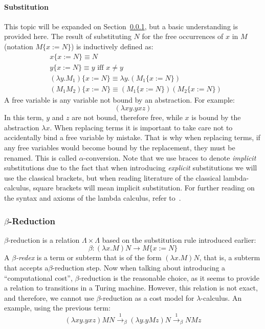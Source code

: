 \documentclass[11pt]{article}
\begin{document}
\paragraph{Substitution} This topic will be expanded on Section~\ref{reduction}, but a basic understanding is provided here.
The result of substituting $N$ for the free occurrences of $x$ in $M$ (notation $M \{ x:= N \} $) is inductively defined as:
\begin{equation*}
  \begin{split}
    & x\{ x := N \} \equiv N \\
    & y \{ x := N \} \equiv y \text{ iff } x \neq y \\
    & (\lambda y.M_{1}) \{ x:=N \} \equiv \lambda y. ( M_{1} \{ x:=N \} ) \\
    & (M_{1}M_{2}) \{ x:=N \} \equiv (M_{1}\{ x:=N \} )(M_{2} \{ x:=N \} )
  \end{split}
\end{equation*}
A free variable is any variable not bound by an abstraction. For example:
\begin{equation*}
  (\lambda x y . y x z )
\end{equation*}
In this term, $y$ and $z$ are not bound, therefore free, while $x$ is bound by the abstraction $\lambda x$.
When replacing terms it is important to take care not to accidentally bind a free variable by mistake. That is why when replacing terms, if any free variables would become bound by the replacement, they must be renamed. This is called $\alpha$-conversion.
Note that we use braces to denote \textit{implicit} substitutions due to the fact that when introducing \textit{explicit} substitutions we will use the classical brackets, but when reading literature of the classical lambda-calculus, square brackets will mean implicit substitution.
For further reading on the syntax and axioms of the lambda calculus, refer to~\cite{barendregt1984lambda}.

\subsubsection{$\beta$-Reduction}\label{reduction}
$\beta$-reduction is a relation $\Lambda \times \Lambda$ based on the substitution rule introduced earlier:
\begin{equation}
	\beta : ( \lambda x.M ) N \rightarrow M \{ x:=N \}
\end{equation}
A \textit{$\beta$-redex} is a term or subterm that is of the form $(\lambda x . M)N$, that is, a subterm that accepts a$\beta$-reduction step.
Now when talking about introducing a \enquote{computational cost}, $\beta$-reduction is the reasonable choice, as it seems to provide a relation to transitions in a Turing machine. However, this relation is not exact, and therefore, we cannot use $\beta$-reduction as a cost model for $\lambda$-calculus.
An example, using the previous term:
\begin{equation*}
  ( \lambda xy. yxz ) M N \xrightarrow{1}_{\beta}  (\lambda y . y M z ) N \xrightarrow{1}_{\beta} N M z
\end{equation*}
\end{document}
